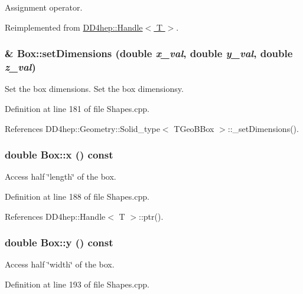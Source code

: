 Assignment operator. 

Reimplemented from \hyperlink{class_d_d4hep_1_1_handle_a9bbf8f498df42e81ad26fb00233505a6}{DD4hep::Handle$<$ T $>$}.\hypertarget{class_d_d4hep_1_1_geometry_1_1_box_aa747479d055c62966ac21ac49355a2dc}{
\subsubsection[{setDimensions}]{ \& Box::setDimensions (double {\em x\_\-val}, \/  double {\em y\_\-val}, \/  double {\em z\_\-val})}}
\label{class_d_d4hep_1_1_geometry_1_1_box_aa747479d055c62966ac21ac49355a2dc}


Set the box dimensions. Set the box dimensionsy. 

Definition at line 181 of file Shapes.cpp.

References DD4hep::Geometry::Solid\_\-type$<$ TGeoBBox $>$::\_\-setDimensions().\hypertarget{class_d_d4hep_1_1_geometry_1_1_box_ae9b52725587d2f97173045ec1c53f83f}{
\subsubsection[{x}]{\setlength{\rightskip}{0pt plus 5cm}double Box::x () const}}
\label{class_d_d4hep_1_1_geometry_1_1_box_ae9b52725587d2f97173045ec1c53f83f}


Access half \char`\"{}length\char`\"{} of the box. 

Definition at line 188 of file Shapes.cpp.

References DD4hep::Handle$<$ T $>$::ptr().\hypertarget{class_d_d4hep_1_1_geometry_1_1_box_a98e1d55c9bab25b05edeebf18f227325}{
\subsubsection[{y}]{\setlength{\rightskip}{0pt plus 5cm}double Box::y () const}}
\label{class_d_d4hep_1_1_geometry_1_1_box_a98e1d55c9bab25b05edeebf18f227325}


Access half \char`\"{}width\char`\"{} of the box. 

Definition at line 193 of file Shapes.cpp.

